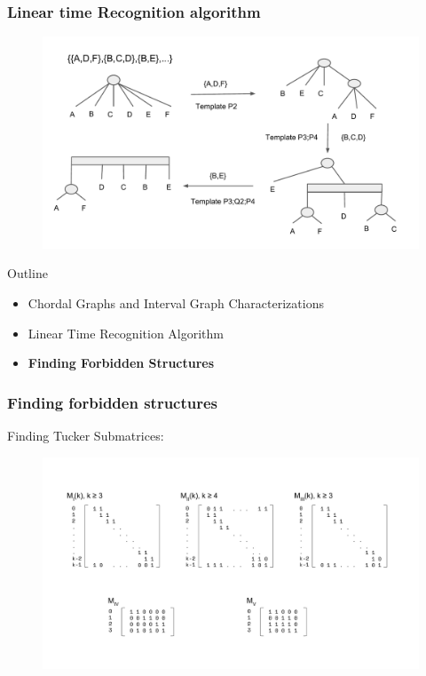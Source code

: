 \documentclass{beamer}
\begin{document}
\begin{frame}
	\frametitle{Linear time Recognition algorithm}
    
	\begin{figure}
		\includegraphics[width = 1\textwidth]{figures/pqtree_4.pdf}
	\end{figure}
	
\end{frame}

\begin{frame}{Outline}
\begin{itemize}
    \item Chordal Graphs and Interval Graph Characterizations
    \vspace{0.2in}
    \item Linear Time Recognition Algorithm
    \vspace{0.2in}
    \item \textbf{Finding Forbidden Structures}
\end{itemize}
\end{frame}

\begin{frame}
	\frametitle{Finding forbidden structures}
        Finding Tucker Submatrices:
	\begin{figure}
		\includegraphics[width  = 1\textwidth]{figures/tucker_matrix.pdf}
	\end{figure}
	
	
\end{frame}
\end{document}
